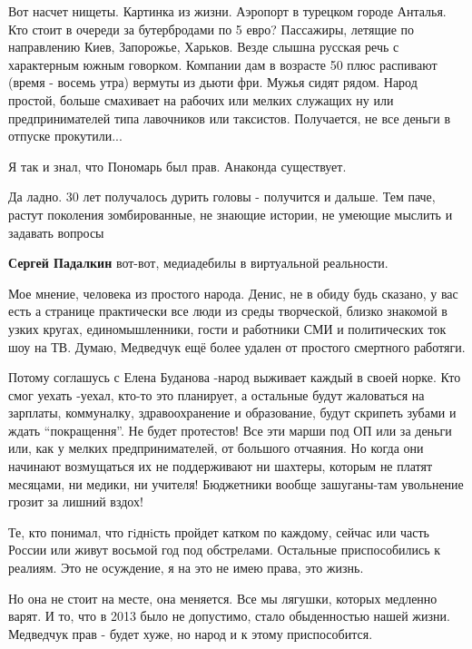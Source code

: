 \begin{itemize}
Вот насчет нищеты. Картинка из жизни. Аэропорт в турецком городе Анталья. Кто
стоит в очереди за бутербродами по 5 евро? Пассажиры, летящие по направлению
Киев, Запорожье, Харьков. Везде слышна русская речь с характерным южным
говорком. Компании дам в возрасте 50 плюс распивают (время - восемь утра)
вермуты из дьюти фри. Мужья сидят рядом. Народ простой, больше смахивает на
рабочих или мелких служащих ну или предпринимателей типа лавочников или
таксистов. Получается, не все деньги в отпуске прокутили...

Я так и знал, что Пономарь был прав. Анаконда существует.


Да ладно. 30 лет получалось дурить головы - получится и дальше. Тем паче,
растут поколения зомбированные, не знающие истории, не умеющие мыслить и
задавать вопросы

\begin{itemize} %
\textbf{Сергей Падалкин} вот-вот, медиадебилы в виртуальной реальности.
\end{itemize} %


Мое мнение, человека из простого народа. Денис, не в обиду будь сказано, у вас
есть а странице практически все люди из среды творческой, близко знакомой в
узких кругах, единомышленники, гости и работники СМИ и политических ток шоу на
ТВ. Думаю, Медведчук ещё более удален от простого смертного работяги.

Потому соглашусь с Елена Буданова -народ выживает каждый в своей норке. Кто
смог уехать -уехал, кто-то это планирует, а остальные будут жаловаться на
зарплаты, коммуналку, здравоохранение и образование, будут скрипеть зубами и
ждать \enquote{покращення}. Не будет протестов! Все эти марши под ОП или за
деньги или, как у мелких предпринимателей, от большого отчаяния. Но когда они
начинают возмущаться их не поддерживают ни шахтеры, которым не платят месяцами,
ни медики, ни учителя! Бюджетники вообще зашуганы-там увольнение грозит за
лишний вздох!

Те, кто понимал, что гiднiсть пройдет катком по каждому, сейчас или часть
России или живут восьмой год под обстрелами. Остальные приспособились к
реалиям. Это не осуждение, я на это не имею права, это жизнь.

Но она не стоит на месте, она меняется. Все мы лягушки, которых медленно варят.
И то, что в 2013 было не допустимо, стало обыденностью нашей жизни.  Медведчук
прав - будет хуже, но народ и к этому приспособится.


\end{itemize}
